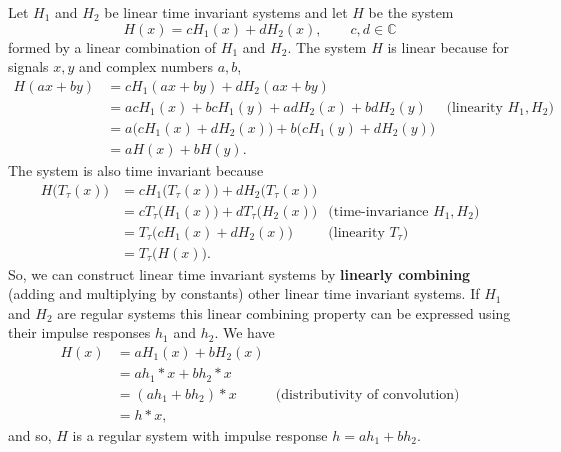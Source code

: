 \documentclass[11pt,a4paper]{book}
\theoremstyle{plain}
\numberwithin{equation}{section}
\newcommand{\complex}{{\mathbb C}}
\newcommand{\term}{\textbf}
\begin{document}
Let $H_1$ and $H_2$ be linear time invariant systems and let $H$ be the system
\[
H(x) = cH_1(x) + dH_2(x), \qquad c,d \in \complex
\]
formed by a linear combination of $H_1$ and $H_2$.  The system $H$ is linear because for signals $x,y$ and complex numbers $a,b$,
\begin{align*}
H(ax + by) &= cH_1(ax+by) + dH_2(ax+by) \\
&= acH_1(x)+bcH_1(y) + adH_2(x)+ bdH_2(y) & \text{(linearity $H_1, H_2$)} \\
&= a\big( cH_1(x)  + dH_2(x) \big) + b\big( cH_1(y) + dH_2(y) \big) \\
&= aH(x) + bH(y).
\end{align*}
The system is also time invariant because
\begin{align*}
H\big(T_\tau(x)\big) &= cH_1\big(T_\tau(x)\big) + dH_2\big(T_\tau(x)\big)  \\
&= c T_\tau\big( H_1(x)\big) + dT_\tau\big(H_2(x)\big) & \text{(time-invariance $H_1,H_2$)} \\
&= T_\tau\big( cH_1(x) + dH_2(x)\big) & \text{(linearity $T_\tau$)} \\
&= T_\tau\big(H(x)\big).
\end{align*}
So, we can construct linear time invariant systems by \term{linearly combining} (adding and multiplying by constants) other linear time invariant systems.  If $H_1$ and $H_2$ are regular systems this linear combining property can be expressed using their impulse responses $h_1$ and $h_2$.  We have
\begin{align*}
H(x) &= a H_1(x) + b H_2(x) \\
&= a h_1 * x + b h_2 * x \\
&= (a h_1 + bh_2) * x &\text{(distributivity of convolution)}\\
&= h * x,
\end{align*}
and so, $H$ is a regular system with impulse response $h = ah_1 + bh_2$.  %
\end{document}
